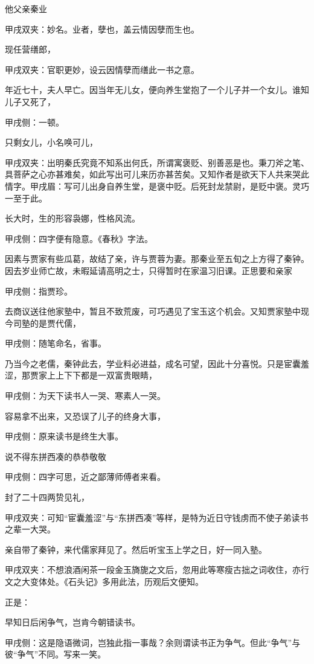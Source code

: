\begin{parag}
    他父亲秦业\begin{note}甲戌双夹：妙名。业者，孽也，盖云情因孽而生也。\end{note}现任营缮郎，\begin{note}甲戌双夹：官职更妙，设云因情孽而缮此一书之意。\end{note}年近七十，夫人早亡。因当年无儿女，便向养生堂抱了一个儿子并一个女儿。谁知儿子又死了，\begin{note}甲戌侧：一顿。\end{note}只剩女儿，小名唤可儿，\begin{note}甲戌双夹：出明秦氏究竟不知系出何氏，所谓寓褒贬、别善恶是也。秉刀斧之笔、具菩萨之心亦甚难矣，如此写出可儿来历亦甚苦矣。又知作者是欲天下人共来哭此情字。甲戌眉：写可儿出身自养生堂，是褒中贬。后死封龙禁尉，是贬中褒。灵巧一至于此。\end{note}长大时，生的形容袅娜，性格风流。\begin{note}甲戌侧：四字便有隐意。《春秋》字法。\end{note}因素与贾家有些瓜葛，故结了亲，许与贾蓉为妻。那秦业至五旬之上方得了秦钟。因去岁业师亡故，未暇延请高明之士，只得暂时在家温习旧课。正思要和亲家\begin{note}甲戌侧：指贾珍。\end{note}去商议送往他家塾中，暂且不致荒废，可巧遇见了宝玉这个机会。又知贾家塾中现今司塾的是贾代儒，\begin{note}甲戌侧：随笔命名，省事。\end{note}乃当今之老儒，秦钟此去，学业料必进益，成名可望，因此十分喜悦。只是宦囊羞涩，那贾家上上下下都是一双富贵眼睛，\begin{note}甲戌侧：为天下读书人一哭、寒素人一哭。\end{note}容易拿不出来，又恐误了儿子的终身大事，\begin{note}甲戌侧：原来读书是终生大事。\end{note}说不得东拼西凑的恭恭敬敬\begin{note}甲戌侧：四字可思，近之鄙薄师傅者来看。\end{note}封了二十四两贽见礼，\begin{note}甲戌双夹：可知“宦囊羞涩”与“东拼西凑”等样，是特为近日守钱虏而不使子弟读书之辈一大哭。\end{note}亲自带了秦钟，来代儒家拜见了。然后听宝玉上学之日，好一同入塾。\begin{note}甲戌双夹：不想浪酒闲茶一段金玉旖旎之文后，忽用此等寒瘦古拙之词收住，亦行文之大变体处。《石头记》多用此法，历观后文便知。\end{note}正是：
\end{parag}


\begin{poem}
    \begin{pl}早知日后闲争气，岂肯今朝错读书。\end{pl}
    \begin{note}甲戌侧：这是隐语微词，岂独此指一事哉？余则谓读书正为争气。但此“争气”与彼“争气”不同。写来一笑。\end{note}
\end{poem}